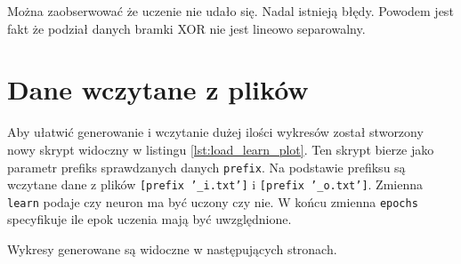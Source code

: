 \documentclass[pointlessnumbers, abstracton, headsepline, a4paper]{scrartcl}
\begin{document}
Można zaobserwować że uczenie nie udało się. Nadal istnieją błędy. Powodem jest fakt że podział danych bramki XOR nie jest lineowo separowalny.

\clearpage
\section{Dane wczytane z plików}

Aby ułatwić generowanie i wczytanie dużej ilości wykresów został stworzony nowy skrypt widoczny w listingu \ref{lst:load_learn_plot}. Ten skrypt bierze jako parametr prefiks sprawdzanych danych \texttt{prefix}. Na podstawie prefiksu są wczytane dane z plików \texttt{[prefix '\_i.txt']} i \texttt{[prefix '\_o.txt']}. Zmienna \texttt{learn} podaje czy neuron ma być uczony czy nie. W końcu zmienna \texttt{epochs} specyfikuje ile epok uczenia mają być uwzględnione.

\begin{center}
\begin{minipage}{0.8\textwidth}

\end{minipage}
\end{center}

Wykresy generowane są widoczne w następujących stronach.
\end{document}
